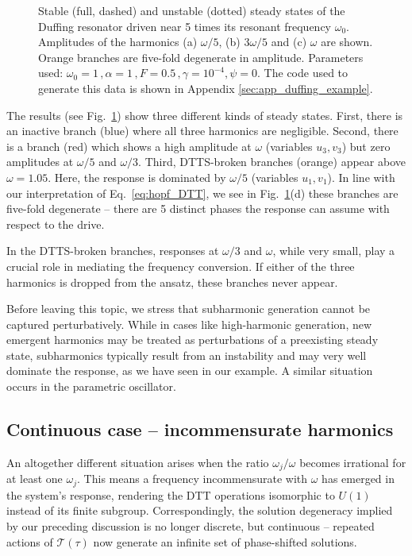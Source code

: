 \begin{figure}[h!]
	\centering
	
	\caption{Stable (full, dashed) and unstable (dotted) steady states of the Duffing resonator driven near 5 times its resonant frequency $\omega_0$. Amplitudes of the harmonics (a) $\omega/5$, (b) $3\omega /5$ and (c) $\omega$ are shown. Orange branches are five-fold degenerate in amplitude. Parameters used: $\omega_0 = 1 \,, \alpha = 1 \,, F = 0.5 \,, \gamma = 10^{-4}, \psi=0$. The code used to generate this data is shown in Appendix \ref{sec:app_duffing_example}.}
	\label{fig:hb_duff_sub}
\end{figure}

The results (see Fig.~\ref{fig:hb_duff_sub}) show three different kinds of steady states. First, there is an inactive branch (blue) where all three harmonics are negligible. Second, there is a branch (red) which shows a high amplitude at $\omega$ (variables $u_3, v_3$) but zero amplitudes at $\omega/5$ and $\omega/3$. 
Third, DTTS-broken branches (orange) appear above $\omega=1.05$. Here, the response is dominated by $\omega/5$ (variables $u_1, v_1$).  
In line with our interpretation of Eq.~\eqref{eq:hopf_DTT}, we see in Fig.~\ref{fig:hb_duff_sub}(d) these branches are five-fold degenerate -- there are 5 distinct phases the response can assume with respect to the drive.

In the DTTS-broken branches, responses at $\omega/3$ and $\omega$, while very small, play a crucial role in mediating the frequency conversion. If either of the three harmonics is dropped from the ansatz, these branches never appear. 

Before leaving this topic, we stress that subharmonic generation cannot be captured perturbatively. While in cases like high-harmonic generation, new emergent harmonics may be treated as perturbations of a preexisting steady state, subharmonics typically result from an instability and may very well dominate the response, as we have seen in our example. A similar situation occurs in the parametric oscillator. 

\subsection{Continuous case -- incommensurate harmonics} 

An altogether different situation arises when the ratio $\omega_j / \omega$ becomes irrational for at least one $\omega_j$. This means a frequency incommensurate with $\omega$ has emerged in the system's response, rendering the DTT operations isomorphic to $U(1)$ instead of its finite subgroup. Correspondingly, the solution degeneracy implied by our preceding discussion is no longer discrete, but continuous -- repeated actions of $\mathcal{T}(\tau)$ now generate an infinite set of phase-shifted solutions. 

